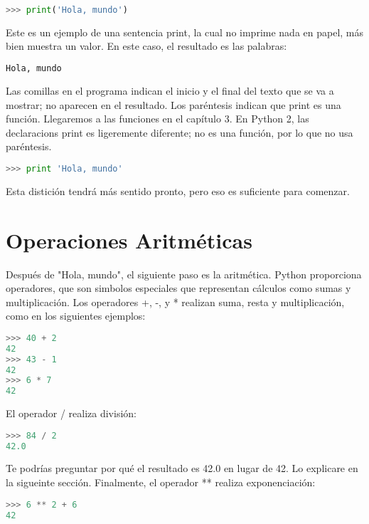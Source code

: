 \documentclass[12pt,letterpaper]{book}
\begin{document}
\begin{lstlisting}[language=Python, basicstyle=\ttfamily]
>>> print('Hola, mundo')
\end{lstlisting}

Este es un ejemplo de una sentencia print, la cual no imprime nada en papel,
más bien muestra un valor. En este caso, el resultado es las palabras:

\begin{lstlisting}[language=Python, basicstyle=\ttfamily]
Hola, mundo
\end{lstlisting}

Las comillas en el programa indican el inicio y el final del texto que se va a mostrar;
no aparecen en el resultado. Los paréntesis indican que print es una función. Llegaremos a las funciones en el capítulo 3.
En Python 2, las declaracions print es ligeremente diferente; no es una función,
por lo que no usa paréntesis.

\begin{lstlisting}[language=Python, basicstyle=\ttfamily]
>>> print 'Hola, mundo'
\end{lstlisting}

Esta distición tendrá más sentido pronto, pero eso es suficiente para comenzar.

\section{Operaciones Aritméticas}
Después de "Hola, mundo", el siguiente paso es la aritmética. Python proporciona operadores, 
que son simbolos especiales que representan cálculos como sumas y multiplicación. 
Los operadores +, -, y * realizan suma, resta y multiplicación, 
como en los siguientes ejemplos:

\begin{lstlisting}[language=Python, basicstyle=\ttfamily]
>>> 40 + 2
42
>>> 43 - 1
42
>>> 6 * 7
42
\end{lstlisting}

El operador / realiza división:

\begin{lstlisting}[language=Python, basicstyle=\ttfamily]
>>> 84 / 2
42.0
\end{lstlisting}

Te podrías preguntar por qué el resultado es 42.0 en lugar de 42. Lo explicare en la sigueinte sección.
Finalmente, el operador ** realiza exponenciación:

\begin{lstlisting}[language=Python, basicstyle=\ttfamily]
>>> 6 ** 2 + 6
42
\end{lstlisting}
\end{document}

